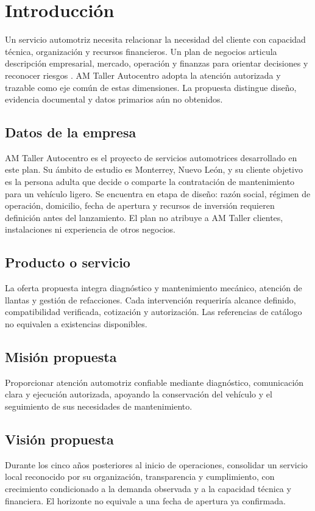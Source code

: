 {\section{Introducción}
Un servicio automotriz necesita relacionar la necesidad del cliente con capacidad técnica, organización y recursos financieros. Un plan de negocios articula descripción empresarial, mercado, operación y finanzas para orientar decisiones y reconocer riesgos \citep{openstaxPlanIntegrador}. AM Taller Autocentro adopta la atención autorizada y trazable como eje común de estas dimensiones. La propuesta distingue diseño, evidencia documental y datos primarios aún no obtenidos.
\subsection{Datos de la empresa}
AM Taller Autocentro es el proyecto de servicios automotrices desarrollado en este plan. Su ámbito de estudio es Monterrey, Nuevo León, y su cliente objetivo es la persona adulta que decide o comparte la contratación de mantenimiento para un vehículo ligero. Se encuentra en etapa de diseño: razón social, régimen de operación, domicilio, fecha de apertura y recursos de inversión requieren definición antes del lanzamiento. El plan no atribuye a AM Taller clientes, instalaciones ni experiencia de otros negocios.
\subsection{Producto o servicio}
La oferta propuesta integra diagnóstico y mantenimiento mecánico, atención de llantas y gestión de refacciones. Cada intervención requeriría alcance definido, compatibilidad verificada, cotización y autorización. Las referencias de catálogo no equivalen a existencias disponibles.
\subsection{Misión propuesta}
Proporcionar atención automotriz confiable mediante diagnóstico, comunicación clara y ejecución autorizada, apoyando la conservación del vehículo y el seguimiento de sus necesidades de mantenimiento.
\subsection{Visión propuesta}
Durante los cinco años posteriores al inicio de operaciones, consolidar un servicio local reconocido por su organización, transparencia y cumplimiento, con crecimiento condicionado a la demanda observada y a la capacidad técnica y financiera. El horizonte no equivale a una fecha de apertura ya confirmada.
}
